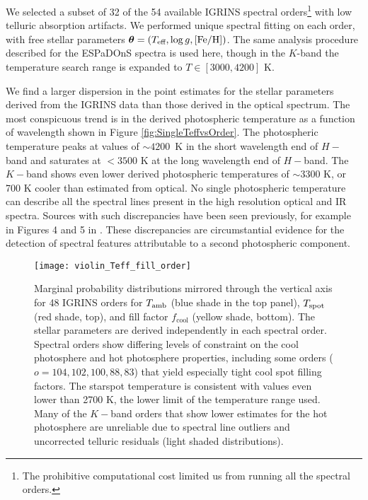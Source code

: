 \documentclass[twocolumn]{emulateapj}%
\begin{document}
We selected a subset of 32 of the 54 available IGRINS spectral orders\footnote{The prohibitive computational cost limited us from running all the spectral orders.} with low telluric absorption artifacts.  We performed unique spectral fitting on each order, with free stellar parameters ${\bm \theta} = (T_\textrm{eff}, \log g, [{\rm Fe}/{\rm H}])$.  The same analysis procedure described for the ESPaDOnS spectra is used here, though in the $K$-band the temperature search range is expanded to $T \in [3000, 4200]$ K.

We find a larger dispersion in the point estimates for the stellar parameters derived from the IGRINS data than those derived in the optical spectrum.  The most conspicuous trend is in the derived photospheric temperature as a function of wavelength shown in Figure \ref{fig:SingleTeffvsOrder}.  The photospheric temperature peaks at values of $\sim4200$~K in the short wavelength end of $H-$band and saturates at $<3500$ K at the long wavelength end of $H-$band.  The $K-$band shows even lower derived photospheric temperatures of $\sim3300$ K, or 700 K cooler than estimated from optical.  No single photospheric temperature can describe all the spectral lines present in the high resolution optical and IR spectra.  
Sources with such discrepancies have been seen previously, for example in Figures 4 and 5 in \citet{bouvier92}.  These discrepancies are circumstantial evidence for the detection of spectral features attributable to a second photospheric component.


\begin{figure*}
 \centering
 \texttt{[image: violin\_Teff\_fill\_order]} 
 \caption{Marginal probability distributions mirrored through the vertical axis \citep[``Violin plot'']{waskom14} for 48 IGRINS orders for $T_\textrm{amb}$ (blue shade in the top panel), $T_\textrm{spot}$ (red shade, top), and fill factor $f_{\mathrm{cool}}$ (yellow shade, bottom).  The stellar parameters are derived independently in each spectral order.  Spectral orders show differing levels of constraint on the cool photosphere and hot photosphere properties, including some orders ($o=104, 102, 100, 88, 83$) that yield especially tight cool spot filling factors.  The starspot temperature is consistent with values even lower than 2700 K, the lower limit of the temperature range used.  Many of the $K-$band orders that show lower estimates for the hot photosphere are unreliable due to spectral line outliers and uncorrected telluric residuals (light shaded distributions).}
 \label{fig:TwoTempResults}
\end{figure*}
\end{document}
